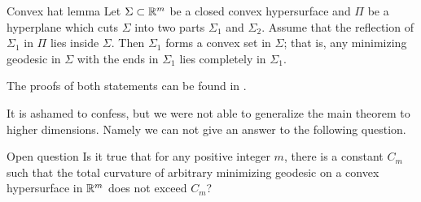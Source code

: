 \documentclass[a4paper,10pt]{article}
\begin{document}
\begin{thm}{Convex hat lemma}
Let $\Sigma\subset\mathbb{R}^m$ be a closed convex hypersurface and
$\Pi$ be a hyperplane which cuts $\Sigma$ into two parts $\Sigma_1$ and $\Sigma_2$.
Assume that the reflection of $\Sigma_1$ in $\Pi$ lies inside $\Sigma$.
Then $\Sigma_1$ forms a convex set in $\Sigma$;
that is, any minimizing geodesic in $\Sigma$ with the ends in $\Sigma_1$ lies completely in $\Sigma_1$.
\end{thm}

The proofs of both statements can be found in \cite{petrunin-orthodox}.

\medskip

It is ashamed to confess, but we were not able to generalize the main theorem to higher dimensions.
Namely we can not give an answer to the following question.

\begin{thm}{Open question}
Is it true that for any positive integer $m$,
there is a constant $C_m$
such that the total curvature of arbitrary minimizing geodesic on a convex hypersurface in $\mathbb{R}^m$ does not exceed $C_m$?
\end{thm}



\Addresses
\end{document}
